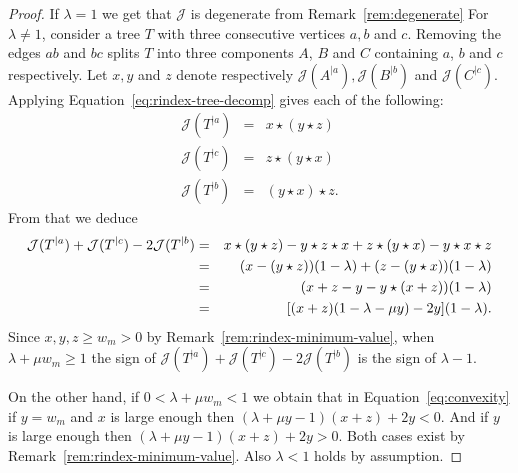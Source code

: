 \documentclass[11 pt]{modarticle}
\newcommand{\wmin}{w_m}
\newcommand{\rtree}[2]{{#1}^{\lvert #2}}
\newcommand{\rindexsymbol}{\mathcal{J}}
\newcommand{\rindex}[2]{\rindexsymbol(\rtree{#2}{#1})}
\begin{document}
\begin{proof}
If $\lambda = 1$ we get that $\rindexsymbol$ is degenerate from Remark~\ref{rem:degenerate} %
For $\lambda \neq 1$, consider a tree $T$ with three consecutive vertices $a,b$ and $c$. Removing the edges $ab$ and $bc$ splits $T$ into three components $A$, $B$ and $C$ containing $a$, $b$ and $c$ respectively. Let $x,y$ and $z$ denote respectively $\rindex{a}{A}, \rindex{b}{B}$ and $\rindex{c}{C}$. Applying Equation~\eqref{eq:rindex-tree-decomp} gives each of the following:
\begin{eqnarray*}
	\rindex{a}{T} & = & x \star (y \star z) \\
	\rindex{c}{T} & = & z \star (y \star x) \\
	\rindex{b}{T} & = & (y \star x) \star z.
\end{eqnarray*}
From that we deduce
\begin{eqnarray}
	\rindex{a}{T} + \rindex{c}{T} - 2 \rindex{b}{T} & = & x \star (y \star z) - y \star z \star x +  z \star (y \star x) - y\star x \star z \notag \\  
	& = & (x - (y\star z))(1 - \lambda) + (z - (y \star x))(1 - \lambda) \notag \\
	& = & (x + z - y - y \star (x + z)) (1 - \lambda) \notag\\
	& = & [(x + z)(1 - \lambda - \mu y) - 2y] (1 - \lambda). \label{eq:convexity}
\end{eqnarray}
Since $x,y,z \geq \wmin > 0$ by Remark~\ref{rem:rindex-minimum-value}, when $\lambda + \mu \wmin \geq 1$ the sign of $\rindex{a}{T} + \rindex{c}{T} - 2 \rindex{b}{T}$ is the sign of $\lambda - 1$.

On the other hand, if $0 < \lambda + \mu \wmin < 1$ we obtain that in Equation~\eqref{eq:convexity} if $y = \wmin$ and $x$ is large enough then $(\lambda + \mu y - 1)(x+z) + 2y < 0$. And if $y$ is large enough then $(\lambda + \mu y - 1)(x+z) + 2y > 0$. Both cases exist by Remark~\ref{rem:rindex-minimum-value}. Also $\lambda < 1$ holds by assumption.
\end{proof}
\end{document}
